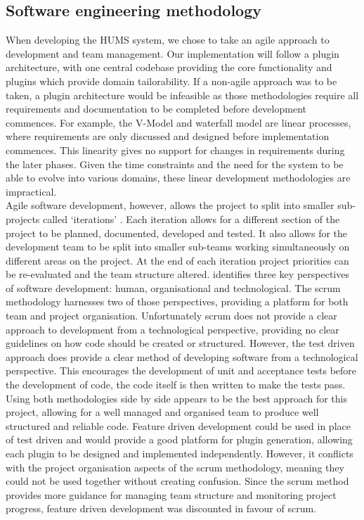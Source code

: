 \documentclass[10pt,a4paper]{article}
\begin{document}
\subsection{Software engineering methodology}
When developing the HUMS system, we chose to take an agile approach to
development and team management. Our implementation will follow a plugin
architecture, with one central codebase providing the core functionality and
plugins which provide domain tailorability. If a non-agile approach was to be
taken, a plugin architecture would be infeasible as those methodologies require
all requirements and documentation to be completed before development commences.
For example, the V-Model and waterfall model are linear processes, where
requirements are only discussed and designed before implementation commences.
This linearity gives no support for changes in requirements during the later
phases. Given the time constraints and the need for the system to be able to
evolve into various domains, these linear development methodologies are
impractical. \\
Agile software development, however, allows the project to split into smaller
sub-projects called `iterations' \cite{hazzan2008agile}. Each iteration allows
for a different section of the project to be planned, documented, developed and
tested. It also allows for the development team to be split into smaller
sub-teams working simultaneously on different areas on the project. At the end
of each iteration project priorities can be re-evaluated and the team structure
altered. 
\cite{hazzan2008agile} identifies three key perspectives of software
development: human, organisational and technological. The scrum methodology
harnesses two of those perspectives, providing a platform for both team and
project organisation. Unfortunately scrum does not provide a clear approach to
development from a technological perspective, providing no clear guidelines on
how code should be created or structured. However, the test driven approach does
provide a clear method of developing software from a technological perspective.
This encourages the development of unit and acceptance tests before the
development of code, the code itself is then written to make the tests pass.
Using both methodologies side by side appears to be the best approach for this
project, allowing for a well managed and organised team to produce well
structured and reliable code. Feature driven development could be used in place
of test driven and would provide a good platform for plugin generation, allowing
each plugin to be designed and implemented independently. However, it conflicts
with the project organisation aspects of the scrum methodology, meaning they
could not be used together without creating confusion. Since the scrum method
provides more guidance for managing team structure and monitoring project
progress, feature driven development was discounted in favour of scrum.
\end{document}
